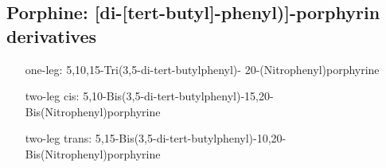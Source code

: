 %


\subsection{Porphine: [di-[tert-butyl]-phenyl)]-porphyrin derivatives}
\label{sec:TBP}
\begin{itemize}
	\item[one-leg:]  	 5,10,15-Tri(3,5-di-tert-butylphenyl)-   20-(Nitrophenyl)porphyrine
	\item[two-leg cis:] 	5,10-Bis(3,5-di-tert-butylphenyl)-15,20-Bis(Nitrophenyl)porphyrine
	\item[two-leg trans:] 	5,15-Bis(3,5-di-tert-butylphenyl)-10,20-Bis(Nitrophenyl)porphyrine
\end{itemize}

